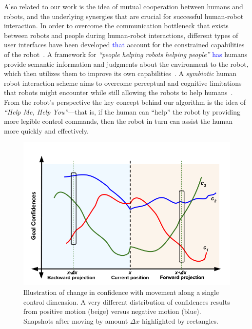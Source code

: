 \documentclass[conference]{IEEEtran}
\begin{document}
Also related to our work is the idea of mutual cooperation between humans and robots, and the underlying synergies that are crucial for successful human-robot interaction. In order to overcome the communication bottleneck that exists between robots and people during human-robot interactions, different types of user interfaces have been developed \textcolor{blue}{that} account for the constrained capabilities of the robot~\cite{goodfellow2010help}. A framework for \textit{``people helping robots helping people''} \textcolor{blue}{has} humans provide semantic information and judgments about the environment to the robot, which then utilizes them to improve its own capabilities~\cite{sorokin2010people}. A \textit{symbiotic} human robot interaction scheme aims to overcome perceptual and cognitive limitations that robots might encounter while still allowing the robots to help humans~\cite{rosenthal2010effective}. From the robot's perspective the key concept behind our algorithm is the idea of \textit{``Help Me, Help You''}---that is, if the human can ``help'' the robot by providing more legible control commands, then the robot in turn can assist the human more quickly and effectively.

\begin{figure}
	\includegraphics[width = 1\hsize, height = 0.26\vsize]{./figures/DisambMetric_New2.png}
	\vspace{-0.4cm}
	\caption{Illustration of change in confidence with movement along a single control dimension. A very different distribution of confidences results from positive motion (beige) versus negative motion (blue). Snapshots after moving by amount $\Delta x$ highlighted by rectangles.}
	\label{DM_FIG}
\end{figure}
\end{document}
